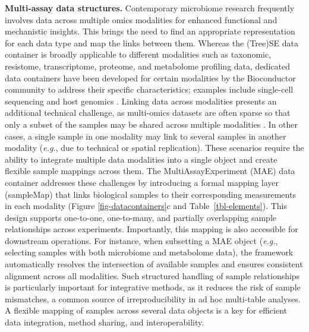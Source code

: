 \documentclass[
  sn-nature,
]{sn-jnl}
\begin{document}
\textbf{Multi-assay data structures.} Contemporary microbiome research
frequently involves data across multiple omics modalities for enhanced
functional and mechanistic insights. This brings the need to find an
appropriate representation for each data type and map the links between
them. Whereas the (Tree)SE data container is broadly applicable to
different modalities such as taxonomic, resistome, transcriptome,
proteome, and metabolome profiling data, dedicated data containers have
been developed for certain modalities by the Bioconductor community to
address their specific characteristics; examples include single-cell
sequencing \citep{amezquita2020} and host genomics \citep{lawrence2013}.
Linking data across modalities presents an additional technical
challenge, as multi-omics datasets are often sparse so that only a
subset of the samples may be shared across multiple modalities
\citep{sherwani2025}. In other cases, a single sample in one modality
may link to several samples in another modality \citep{husso2023}
(\emph{e.g.}, due to technical or spatial replication). These scenarios
require the ability to integrate multiple data modalities into a single
object and create flexible sample mappings across them. The
MultiAssayExperiment (MAE) data container \citep{ramos2017} addresses
these challenges by introducing a formal mapping layer (sampleMap) that
links biological samples to their corresponding measurements in each
modality (Figure \ref{fig-datacontainers}c and
Table~\ref{tbl-elements}). This design supports one-to-one, one-to-many,
and partially overlapping sample relationships across experiments.
Importantly, this mapping is also accessible for downstream operations.
For instance, when subsetting a MAE object (\emph{e.g.}, selecting
samples with both microbiome and metabolome data), the framework
automatically resolves the intersection of available samples and ensures
consistent alignment across all modalities. Such structured handling of
sample relationships is particularly important for integrative methods,
as it reduces the risk of sample mismatches, a common source of
irreproducibility in ad hoc multi-table analyses. A flexible mapping of
samples across several data objects is a key for efficient data
integration, method sharing, and interoperability.
\end{document}
